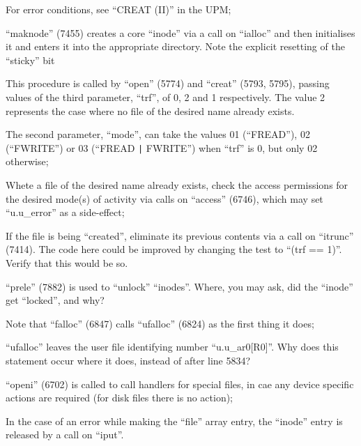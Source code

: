 \item[5788:] For error conditions, see ``CREAT
 (II)'' in the UPM;

\item[5790:] ``maknode'' (7455) creates a core
 ``inode'' via a call on ``ialloc''
 and then initialises it and
 enters it into the appropriate
 directory. Note the explicit
 resetting of the ``sticky'' bit
\ed



This procedure is called by ``open''
(5774) and ``creat'' (5793, 5795), passing values of the third parameter,
``trf'', of 0, 2 and 1 respectively. The
value 2 represents the case where no
file of the desired name already
exists.

\bd
\item[5812:] The second parameter, ``mode'', can
 take the values 01 (``FREAD''), 02
(``FWRITE'') or 03 (``FREAD \verb+|+ FWRITE'')
when ``trf'' is 0, but only 02 otherwise;

Whete a file of the desired name
already exists, check the access
permissions for the desired
mode(s) of activity via calls on
``access'' (6746), which may set
``u.u\_error'' as a side-effect;

\item[5824:] If the file is being ``created'',
 eliminate its previous contents
 via a call on ``itrunc'' (7414).
 The code here could be improved
 by changing the test to ``(trf ==
 1)''. Verify that this would be
 so.

\item[5826:] ``prele'' (7882) is used to
 ``unlock'' ``inodes''. Where, you
 may ask, did the ``inode'' get
 ``locked'', and why?

\item[5827:] Note that ``falloc'' (6847) calls
 ``ufalloc'' (6824) as the first
 thing it does;

\item[5831:] ``ufalloc'' leaves
 the user file
identifying number
``u.u\_ar0[R0]''. Why does this
statement occur where it does,
instead of after line 5834?

\item[5832:] ``openi'' (6702) is called to call
 handlers for special files, in
 cae any device specific actions
 are required (for disk files
 there is no action);

\item[5839:] In the case of an error while
 making the ``file'' array entry,
 the ``inode'' entry is released by
 a call on ``iput''.
\ed

